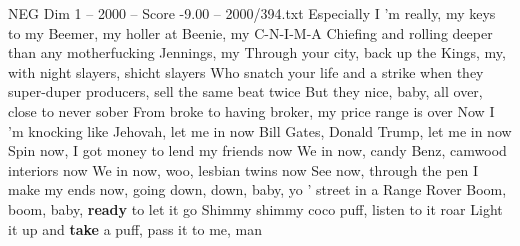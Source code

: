 \begin{textsample}{NEG Dim 1 – 2000 – Score -9.00 – 2000/394.txt}
Especially I 'm really, my keys to my Beemer, my holler at Beenie, my C-N-I-M-A Chiefing and rolling deeper than any motherfucking Jennings, my Through your city, back up the Kings, my, with night slayers, shicht slayers Who snatch your life and a strike when they super-duper producers, sell the same beat twice But they nice, baby, all over, close to never sober From broke to having broker, my price range is over Now I 'm knocking like Jehovah, let me in now Bill Gates, Donald Trump, let me in now Spin now, I got money to lend my friends now We in now, candy Benz, camwood interiors now We in now, woo, lesbian twins now See now, through the pen I make my ends now, going down, down, baby, yo ' street in a Range Rover Boom, boom, baby, \textbf{ready} to let it go Shimmy shimmy coco puff, listen to it roar Light it up and \textbf{take} a puff, pass it to me, man

\end{textsample}
